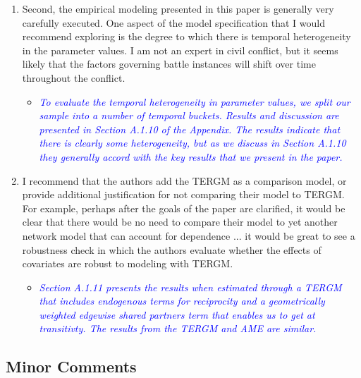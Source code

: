 \begin{enumerate}
\begin{itemize}
{{		}}
	\end{itemize}	
	\item Second, the empirical modeling presented in this paper is generally very carefully executed. One aspect of the model specification that I would recommend exploring is the degree to which there is temporal heterogeneity in the parameter values. I am not an expert in civil conflict, but it seems likely that the factors governing battle instances will shift over time throughout the conflict.
	\begin{itemize}
		\item \textcolor{blue}{ \emph{
		To evaluate the temporal heterogeneity in parameter values, we split our sample into a number of temporal buckets. Results and discussion are presented in Section A.1.10 of the Appendix. The results indicate that there is clearly some heterogeneity, but as we discuss in Section A.1.10 they generally accord with the key results that we present in the paper.
		}}
	\end{itemize}
	\item I recommend that the authors add the TERGM as a comparison model, or provide additional justification for not comparing their model to TERGM. For example, perhaps after the goals of the paper are clarified, it would be clear that there would be no need to compare their model to yet another network model that can account for dependence ... it would be great to see a robustness check in which the authors evaluate whether the effects of covariates are robust to modeling with TERGM.
	\begin{itemize}
		\item \textcolor{blue}{ \emph{
		Section A.1.11 presents the results when estimated through a TERGM that includes endogenous terms for reciprocity and a geometrically weighted edgewise shared partners term that enables us to get at transitivty. The results from the TERGM and AME are similar. 
		}}
	\end{itemize}	
\end{enumerate}

\subsection{Minor Comments}

